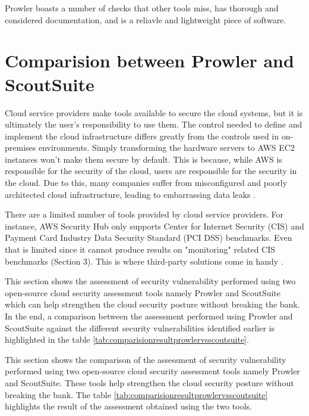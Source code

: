 \par Prowler boasts a number of checks that other tools miss, has thorough and considered documentation, and is a reliavle and lightweight piece of software.

\section{Comparision between Prowler and ScoutSuite}

\par Cloud service providers make tools available to secure the cloud systems, but it is ultimately the user’s responsibility to use them.
The control needed to define and implement the cloud infrastructure differs greatly from the controls used in on-premises environments.
Simply transforming the hardware servers to AWS EC2 instances won't make them secure by default.
This is because, while AWS is responsible for the security of the cloud, users are responsible for the security in the cloud.
Due to this, many companies suffer from misconfigured and poorly architected cloud infrastructure, leading to embarrassing data leaks \cite{74}.

\par There are a limited number of tools provided by cloud service providers.
For instance, AWS Security Hub only supports Center for Internet Security (CIS) and Payment Card Industry Data
Security Standard (PCI DSS) benchmarks.
Even that is limited since it cannot produce results on "monitoring" related CIS benchmarks (Section 3).
This is where third-party solutions come in handy \cite{74}.

\par This section shows the assessment of security vulnerability performed using two open-source cloud security assessment tools namely Prowler and ScoutSuite which can help strengthen the cloud security posture without breaking the bank.
In the end, a comparison between the assessment performed using Prowler and ScoutSuite against the different security vulnerabilities identified earlier is highlighted in the table \ref{tab:comparisionresultprowlervsscoutsuite}.

\par This section shows the comparison of the assessment of security vulnerability performed using two open-source cloud security assessment tools namely Prowler and ScoutSuite.
These tools help strengthen the cloud security posture without breaking the bank.
The table \ref{tab:comparisionresultprowlervsscoutsuite} highlights the result of the assessment obtained using the two tools.

